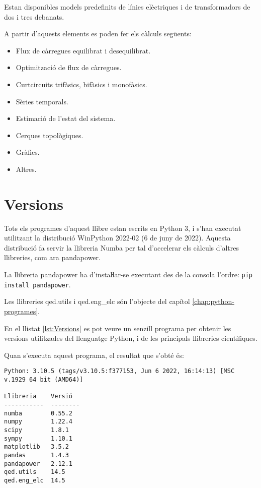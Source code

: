 Estan disponibles models predefinits de línies elèctriques i de transformadors de dos i tres debanats.

A partir d'aquests elements  es poden fer els càlculs següents:
\begin{itemize}
	\item Flux de càrregues equilibrat i desequilibrat.
	\item Optimització de flux de càrregues.
	\item Curtcircuits trifàsics, bifàsics i monofàsics.
	\item Sèries temporals.
	\item Estimació de l'estat del sistema.
	\item Cerques topològiques.
	\item Gràfics.
	\item Altres.
\end{itemize}


\section{Versions}\label{sec:python-versions}

Tots els programes d'aquest llibre estan escrits en Python 3, i s'han executat utilitzant la distribució WinPython 2022-02 (6 de juny de 2022). Aquesta distribució fa servir la llibreria Numba per tal d'accelerar els càlculs d'altres llibreries, com ara pandapower.

La llibreria pandapower ha d'instaŀlar-se executant des de la consola  l'ordre: \texttt{pip install pandapower}.

Les llibreries qed.utils i qed.eng\_elc són l'objecte del capítol \ref{chap:python-programes}. 

En el llistat \vref{lst:Versions} es pot veure un senzill programa per obtenir les versions utilitzades  del llenguatge Python, i de les  principals llibreries científiques.


Quan s'executa aquest programa, el resultat que s'obté és:
\lstset{
	language=,
	numbers=none,
	frame=none
}

\begin{lstlisting}
Python: 3.10.5 (tags/v3.10.5:f377153, Jun 6 2022, 16:14:13) [MSC v.1929 64 bit (AMD64)] 

Llibreria    Versió
-----------  --------
numba        0.55.2
numpy        1.22.4
scipy        1.8.1
sympy        1.10.1
matplotlib   3.5.2
pandas       1.4.3
pandapower   2.12.1
qed.utils    14.5
qed.eng_elc  14.5
\end{lstlisting} 

